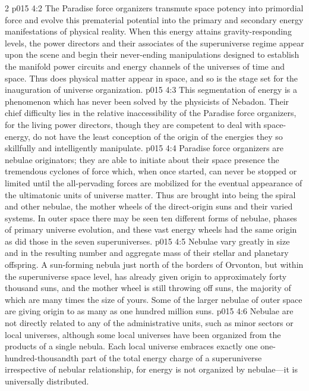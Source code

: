 \begin{multicols}{2}
\vs p015 4:2 The Paradise force organizers transmute space potency into primordial force and evolve this prematerial potential into the primary and secondary energy manifestations of physical reality. When this energy attains gravity\hyp{}responding levels, the power directors and their associates of the superuniverse regime appear upon the scene and begin their never\hyp{}ending manipulations designed to establish the manifold power circuits and energy channels of the universes of time and space. Thus does physical matter appear in space, and so is the stage set for the inauguration of universe organization.
\vs p015 4:3 This segmentation of energy is a phenomenon which has never been solved by the physicists of Nebadon. Their chief difficulty lies in the relative inaccessibility of the Paradise force organizers, for the living power directors, though they are competent to deal with space\hyp{}energy, do not have the least conception of the origin of the energies they so skillfully and intelligently manipulate.
\pc \vs p015 4:4 Paradise force organizers are nebulae originators; they are able to initiate about their space presence the tremendous cyclones of force which, when once started, can never be stopped or limited until the all\hyp{}pervading forces are mobilized for the eventual appearance of the ultimatonic units of universe matter. Thus are brought into being the spiral and other nebulae, the mother wheels of the direct\hyp{}origin suns and their varied systems. In outer space there may be seen ten different forms of nebulae, phases of primary universe evolution, and these vast energy wheels had the same origin as did those in the seven superuniverses.
\pc \vs p015 4:5 Nebulae vary greatly in size and in the resulting number and aggregate mass of their stellar and planetary offspring. A sun\hyp{}forming nebula just north of the borders of Orvonton, but within the superuniverse space level, has already given origin to approximately forty thousand suns, and the mother wheel is still throwing off suns, the majority of which are many times the size of yours. Some of the larger nebulae of outer space are giving origin to as many as one hundred million suns.
\vs p015 4:6 Nebulae are not directly related to any of the administrative units, such as minor sectors or local universes, although some local universes have been organized from the products of a single nebula. Each local universe embraces exactly one one\hyp{}hundred\hyp{}thousandth part of the total energy charge of a superuniverse irrespective of nebular relationship, for energy is not organized by nebulae---it is universally distributed.

\end{multicols}
